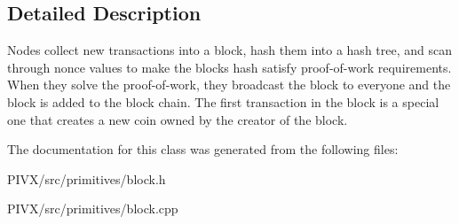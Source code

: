 \subsection{Detailed Description}
Nodes collect new transactions into a block, hash them into a hash tree, and scan through nonce values to make the block\textquotesingle{}s hash satisfy proof-\/of-\/work requirements. When they solve the proof-\/of-\/work, they broadcast the block to everyone and the block is added to the block chain. The first transaction in the block is a special one that creates a new coin owned by the creator of the block. 

The documentation for this class was generated from the following files\+:\begin{DoxyCompactItemize}
\item 
P\+I\+V\+X/src/primitives/block.\+h\item 
P\+I\+V\+X/src/primitives/block.\+cpp\end{DoxyCompactItemize}

